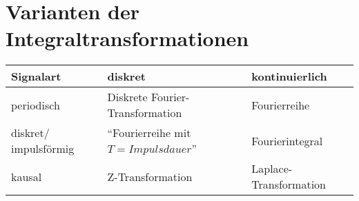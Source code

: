 \section{Varianten der Integraltransformationen }
	\begin{tabular}{|l||l|l|}
	\hline
	\textbf{Signalart}
		& diskret
		& kontinuierlich \\
	\hline \hline
	periodisch
		& Diskrete Fourier-Transformation
		& Fourierreihe \\
	\hline
	diskret/ impulsförmig
		& ``Fourierreihe mit $T = Impulsdauer$''
		& Fourierintegral \\
	\hline
	kausal
		& Z-Transformation
		& Laplace-Transformation \\
	\hline
	\end{tabular}